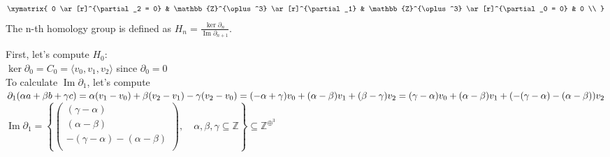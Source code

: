 \documentclass[11pt,a4paper]{report}
\DeclareMathOperator{\Ima}{Im}
\begin{document}
			\[
                \xymatrix{
                    0  \ar[r]^{\partial_2 = 0} & 
                    \mathbb{Z}^{\oplus^3}  \ar[r]^{\partial_1} & 
                    \mathbb{Z}^{\oplus^3}  \ar[r]^{\partial_0 = 0}
                    & 0 \\ }
	        \]
The n-th homology group is defined as $H_n = \frac{\ker\partial_n}{\Ima\partial_{n+1}}$. \\

\par
First, let's compute $H_0$: \\
$\ker\partial_0 = C_0 = \langle v_0, v_1, v_2 \rangle$ since $\partial_0 = 0$ \\ 
To calculate $\Ima\partial_1$, let's compute $\partial_1(\alpha a + \beta b + \gamma c) = \alpha (v_1-v_0) + \beta (v_2-v_1) - \gamma (v_2-v_0) \\ = (-\alpha + \gamma)v_0 + (\alpha - \beta)v_1 + (\beta - \gamma)v_2 = (\gamma -\alpha)v_0 + (\alpha - \beta)v_1 + (-(\gamma - \alpha)-(\alpha - \beta))v_2 $ \\
$\Ima\partial_1 = \left\{ \left(\begin{array}{c}
          		                 	( \gamma - \alpha )\\
          		                 	(\alpha - \beta)\\
          		                 	-(\gamma - \alpha)-(\alpha - \beta)\\
          		                 \end{array} \right), \quad \alpha, \beta, \gamma \subseteq \mathbb{Z} \right\} \subseteq \mathbb{Z}^{\oplus^3} $ \\
          		                 
\end{document}
